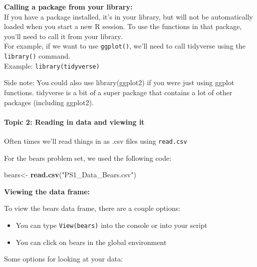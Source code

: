 \documentclass[
]{article}
\newenvironment{Shaded}{\begin{snugshade}}{\end{snugshade}}
\newcommand{\FunctionTok}[1]{\textcolor[rgb]{0.13,0.29,0.53}{\textbf{#1}}}
\newcommand{\NormalTok}[1]{#1}
\newcommand{\OtherTok}[1]{\textcolor[rgb]{0.56,0.35,0.01}{#1}}
\newcommand{\StringTok}[1]{\textcolor[rgb]{0.31,0.60,0.02}{#1}}
\providecommand{\tightlist}{%
  \setlength{\itemsep}{0pt}\setlength{\parskip}{0pt}}
\begin{document}
\textbf{Calling a package from your library:}\\
If you have a package installed, it's in your library, but will not be
automatically loaded when you start a new R session. To use the
functions in that package, you'll need to call it from your library.\\
For example, if we want to use \texttt{ggplot()}, we'll need to call
tidyverse using the \texttt{library()} command.\\
Example: \texttt{library(tidyverse)}

Side note: You could also use library(ggplot2) if you were just using
ggplot functions. tidyverse is a bit of a super package that contains a
lot of other packages (including ggplot2).

\hypertarget{topic-2-reading-in-data-and-viewing-it}{%
\paragraph{Topic 2: Reading in data and viewing
it}\label{topic-2-reading-in-data-and-viewing-it}}

Often times we'll read things in as .csv files using \texttt{read.csv}

For the bears problem set, we used the following code:

\begin{Shaded}
\begin{Highlighting}[]
\NormalTok{bears}\OtherTok{\textless{}{-}} \FunctionTok{read.csv}\NormalTok{(}\StringTok{"PS1\_Data\_Bears.csv"}\NormalTok{)}
\end{Highlighting}
\end{Shaded}

\textbf{Viewing the data frame:}

To view the bears data frame, there are a couple options:

\begin{itemize}
\tightlist
\item
  You can type \texttt{View(bears)} into the console or into your
  script\\
\item
  You can click on bears in the global environment
\end{itemize}

Some options for looking at your data:
\end{document}
